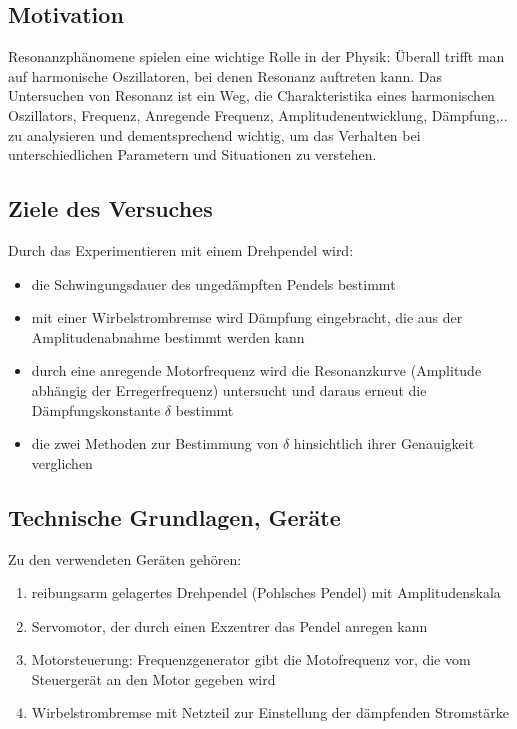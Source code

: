 \subsection{Motivation}
Resonanzphänomene spielen eine wichtige Rolle in der Physik: Überall trifft man auf harmonische Oszillatoren, bei denen Resonanz auftreten kann. Das Untersuchen von Resonanz ist ein Weg, die Charakteristika eines harmonischen Oszillators, Frequenz, Anregende Frequenz, Amplitudenentwicklung, Dämpfung,.. zu analysieren und dementsprechend wichtig, um das Verhalten bei unterschiedlichen Parametern und Situationen zu verstehen. 

\subsection{Ziele des Versuches}
Durch das Experimentieren mit einem Drehpendel wird:
\begin{itemize}
      \item die Schwingungsdauer des ungedämpften Pendels bestimmt
      \item mit einer Wirbelstrombremse wird Dämpfung eingebracht, die aus der Amplitudenabnahme bestimmt werden kann
      \item durch eine anregende Motorfrequenz wird die Resonanzkurve (Amplitude abhängig der Erregerfrequenz) untersucht und daraus erneut die Dämpfungskonstante \(\delta\) bestimmt
      \item die zwei Methoden zur Bestimmung von \(\delta\) hinsichtlich ihrer Genauigkeit verglichen
\end{itemize}

\subsection{Technische Grundlagen, Geräte}
Zu den verwendeten Geräten gehören:
\begin{enumerate}
    \item reibungsarm gelagertes Drehpendel (Pohlsches Pendel) mit Amplitudenskala
    \item Servomotor, der durch einen Exzentrer das Pendel anregen kann
    \item Motorsteuerung: Frequenzgenerator gibt die Motofrequenz vor, die vom Steuergerät an den Motor gegeben wird
    \item Wirbelstrombremse mit Netzteil zur Einstellung der dämpfenden Stromstärke
\end{enumerate}


